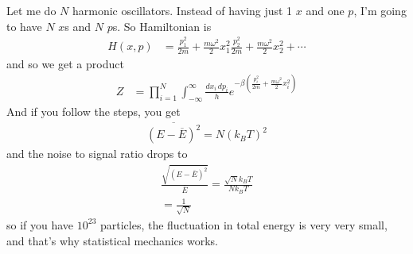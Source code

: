 Let me do $N$ harmonic oscillators.
Instead of having just 1 $x$ and one $p$,
I'm going to have $N$ $x$s and $N$ $p$s.
So Hamiltonian is
\begin{align}
    H(x, p) &=
    \frac{p_1^2}{2m}
    + \frac{m\omega^2}{2} x_1^2
    \frac{p_2^2}{2m}
    + \frac{m\omega^2}{2} x_2^2
    + \cdots
\end{align}
and so we get a product
\begin{align}
    Z &=
    \prod_{i=1}^{N}\int_{-\infty}^{\infty}\frac{dx_i\,dp_i}{h}
    e^{-\beta\left(
        \frac{p_i^2}{2m} + \frac{m\omega^2}{2}x_i^2
    \right)}
\end{align}
And if you follow the steps,
you get
\begin{align}
    \overline{(E - \overline{E})^2} = N(k_B T)^2
\end{align}
and the noise to signal ratio drops to
\begin{align}
    \frac{\sqrt{\overline{(E - \overbar{E})^2}}}{\bar{E}} = 
    \frac{\sqrt{N} k_B T}{N k_B T}\\
    = \frac{1}{\sqrt{N}}
\end{align}
so if you have $10^{23}$ particles,
the fluctuation in total energy is very very small,
and that's why statistical mechanics works.
